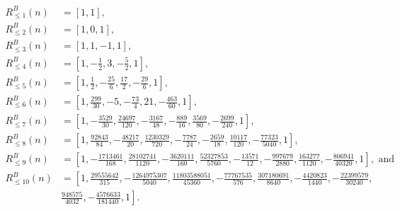 \documentclass{article}
\numberwithin{equation}{section}
\theoremstyle{definition}
\begin{document}
\begin{align*}
R^{B}_{\leq 1}(n) &= \left[1,1\right],\\%
R^{B}_{\leq 2}(n) &= \left[1,0,1\right],\\%
R^{B}_{\leq 3}(n) &= \left[1,1,-1,1\right],\\%
R^{B}_{\leq 4}(n) &= \left[ 1,-\frac{1}{2},3,-\frac{5}{2},1\right],\\%
R^{B}_{\leq  5}(n) &= \left[1,\frac{1}{2},-\frac{25}{6},\frac{17}{2},-\frac{29}{6},1\right],\\%
R^{B}_{\leq 6}(n) &= \left[1,\frac{299}{30},-5,-\frac{73}{4},21,-\frac{463}{60},1\right],\\%
R^{B}_{\leq 7}(n) &= \left[1,-\frac{3529}{30},\frac{24697}{120},-\frac{3167}{48},-\frac{889}{16},\frac{3569}{80},-\frac{2699}{240},1\right],\\%
R^{B}_{\leq 8}(n) &= \left[1,\frac{92843}{84},-\frac{48217}{20},\frac{1230329}{720},- \frac{7787}{24},- \frac{2659}{18},\frac{10117}{120},- \frac{77323}{5040},1\right],\\%
R^{B}_{\leq 9}(n) &=
\left[1, -\frac{1713461}{168}, \frac{28102741}{1120}, -\frac{3620111}{160}, \frac{52327853}{5760}, -\frac{13571}{12}, -\frac{997679}{2880}, \frac{163277}{1120}, -\frac{806941}{40320}, 1\right],\text{ and}\\%
R^{B}_{\leq 10}(n) &=
\left[1, \frac{29555642}{315}, -\frac{1264975307}{5040}, \frac{11803588051}{45360}, -\frac{77767535}{576}, \frac{307180691}{8640}, -\frac{4420823}{1440}, -\frac{22399579}{30240}, \right.\\&\left.\frac{948575}{4032}, -\frac{4576633}{181440}, 1\right].
\end{align*}
\end{document}

